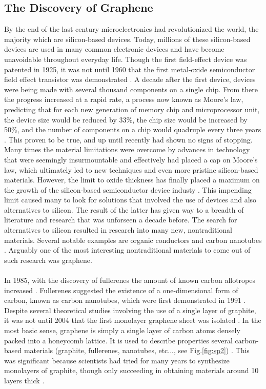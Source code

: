 \documentclass[%
 reprint,
 amsmath,amssymb,
 aps,
pra,
floatfix,
]{revtex4-1}
\begin{document}
\subsection{\label{subsec:discovery} The Discovery of Graphene}
By the end of the last century microelectronics had revolutionized the world, the majority which are silicon-based devices. Today, millions of these silicon-based devices are used in many common electronic devices and have become unavoidable throughout everyday life. Though the first field-effect device was patented in 1925, it was not until 1960 that the first metal-oxide semiconductor field effect transistor was demonstrated \cite{Lilienfeld1925, Atalla1960, Schulz1999}. A decade after the first device, devices were being made with several thousand components on a single chip. From there the progress increased at a rapid rate, a process now known as Moore's law, predicting that for each new generation of memory chip and microprocessor unit, the device size would be reduced by 33\%, the chip size would be increased by 50\%, and the number of components on a chip would quadruple every three years \cite{Schulz1999, Moore1965}. This proven to be true, and up until recently had shown no signs of stopping. Many times the material limitations were overcome by advances in technology that were seemingly insurmountable and effectively had placed a cap on Moore's law, which ultimately led to new techniques and even more pristine silicon-based materials. However, the limit to oxide thickness has finally placed a maximum on the growth of the silicon-based semiconductor device industy \cite{Schulz1999}. This impending limit caused many to look for solutions that involved the use of  devices and also alternatives to silicon. The result of the latter has given way to a breadth of literature and research that was unforseen a decade before. The search for alternatives to silicon resulted in research into many new, nontraditional materials. Several notable examples are organic conductors and carbon nanotubes \cite{Mascaro2001, Baughman2002}. Arguably one of the most interesting nontraditional materials to come out of such research was graphene.  
\\ \\

In 1985, with the discovery of fullerenes the amount of known carbon allotropes increased \cite{krotoFullerenes1985, nanoscaleReview2011}. Fullerenes suggested the existence of a one-dimensional form of carbon, known as carbon nanotubes, which were first demonstrated in 1991 \cite{iijimaCarbonNanotubes1991}. Despite several theoretical studies involving the use of a single layer of graphite, it was not until 2004 that the first monolayer graphene sheet was isolated \cite{novoselovEtAl2004, novoselovEtAl2005}. In the most basic sense, graphene is simply a single layer of carbon atoms densely packed into a honeycomb lattice. It is used to describe properties several carbon-based materials (graphite, fullerenes, nanotubes, etc..., see Fig.\ref{fig:sp2}) \cite{Dresselhaus2002, Brenner2002, novoselovEtAl2004}. This was significant because scientists had tried for many years to synthesize monolayers of graphite, though only succeeding in obtaining materials around 10 layers thick \cite{nanoscaleReview2011}.
\end{document}
